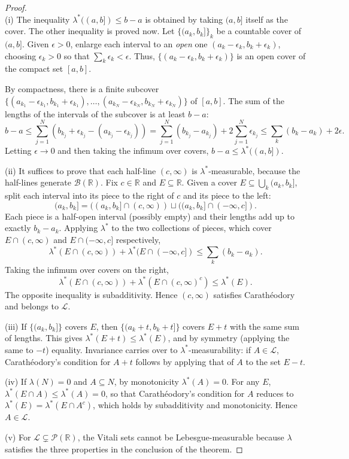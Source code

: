 \documentclass[11pt, a4paper]{article}
\begin{document}
\begin{proof}\leavevmode\\
(i) The inequality $\lambda^*((a, b]) \le b - a$
is obtained by taking $(a, b]$ itself as the cover. The other inequality is proved now. Let
$\{(a_k, b_k]\}_k$ be a countable cover of $(a, b]$. Given $\epsilon > 0$, enlarge each
interval to an \emph{open} one $(a_k - \epsilon_k, b_k + \epsilon_k)$, choosing $\epsilon_k > 0$
so that $\sum_k \epsilon_k < \epsilon$. Thus, $\{(a_k - \epsilon_k, b_k + \epsilon_k)\}$ is an
open cover of the compact set $[a, b]$.

By compactness, there is a finite subcover $\{(a_{k_1} - \epsilon_{k_1}, b_{k_1} +
\epsilon_{k_1}), \dots, (a_{k_N} - \epsilon_{k_N}, b_{k_N} + \epsilon_{k_N})\}$ of $[a, b]$. The sum of the lengths
of the intervals of the subcover is at least $b - a$:
$$ b - a \le \sum_{j=1}^N (b_{k_j} + \epsilon_{k_j} - (a_{k_j} - \epsilon_{k_j})) = \sum_{j=1}^N
(b_{k_j} - a_{k_j}) + 2 \sum_{j=1}^N \epsilon_{k_j} \le \sum_k (b_k - a_k) + 2\epsilon. $$
Letting $\epsilon \to 0$ and then taking the infimum over covers, $b - a \le \lambda^*((a, b])$.

(ii) It suffices to prove that each half-line
$(c, \infty)$ is $\lambda^*$-measurable, because the half-lines generate $\mathcal{B}(\mathbb{R})$.
Fix $c \in \mathbb{R}$ and $E \subseteq \mathbb{R}$. Given a cover $E \subseteq \bigcup_k
(a_k, b_k]$, split each interval into its piece to the right of $c$ and its piece to the left:
$$ (a_k, b_k] = ((a_k, b_k] \cap (c, \infty)) \sqcup ((a_k, b_k] \cap (-\infty, c]). $$
Each piece is a half-open interval (possibly empty) and their lengths add up to exactly
$b_k - a_k$. Applying $\lambda^*$ to the two collections of pieces, which cover
$E \cap (c, \infty)$ and $E \cap (-\infty, c]$ respectively,
$$ \lambda^*(E \cap (c, \infty)) + \lambda^*(E \cap (-\infty, c]) \le \sum_k (b_k - a_k). $$
Taking the infimum over covers on the right,
$$ \lambda^*(E \cap (c, \infty)) + \lambda^*(E \cap (c, \infty)^c) \le \lambda^*(E). $$
The opposite inequality is subadditivity. Hence $(c, \infty)$ satisfies Carathéodory and belongs to
$\mathcal{L}$.

(iii) If $\{(a_k, b_k]\}$ covers $E$, then
$\{(a_k + t, b_k + t]\}$ covers $E + t$ with the same sum of lengths. This gives $\lambda^*(E + t)
\le \lambda^*(E)$, and by symmetry (applying the same to $-t$) equality. Invariance carries
over to $\lambda^*$-measurability: if $A \in \mathcal{L}$, Carathéodory's condition
for $A + t$ follows by applying that of $A$ to the set $E - t$.

(iv) If $\lambda(N) = 0$ and $A \subseteq N$, by monotonicity $\lambda^*(A)
= 0$. For any $E$, $\lambda^*(E \cap A) \le \lambda^*(A) = 0$, so that Carathéodory's
condition for $A$ reduces to $\lambda^*(E) = \lambda^*(E \cap A^c)$, which holds by
subadditivity and monotonicity. Hence $A \in \mathcal{L}$.

(v) For $\mathcal{L} \subsetneq \mathcal{P}(\mathbb{R})$, the Vitali
sets cannot be Lebesgue-measurable because $\lambda$ satisfies the
three properties in the conclusion of the theorem.
\end{proof}
\end{document}
